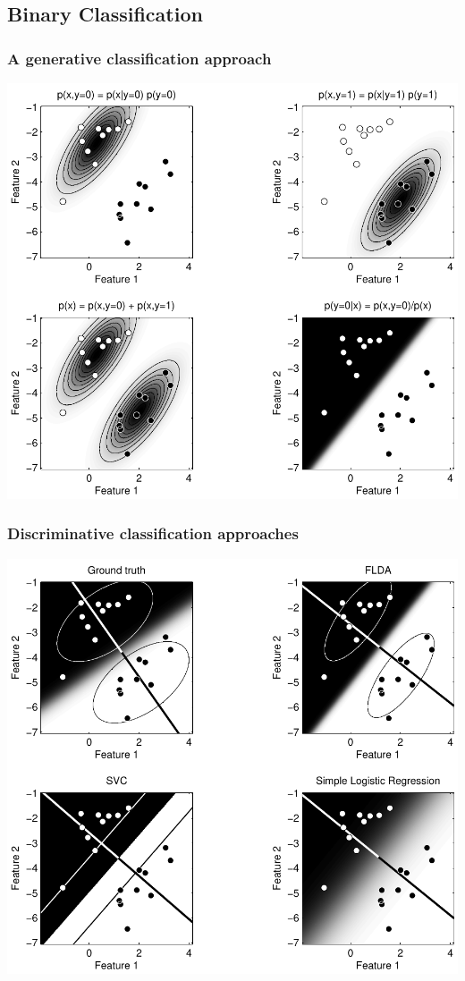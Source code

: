 \documentclass{beamer}
\begin{document}
\subsection{Binary Classification}
\begin{frame}
\frametitle{A generative classification approach}
\begin{center}
\includegraphics[height=.8\textheight]{fld}
\end{center}
\end{frame}

\begin{frame}
\frametitle{Discriminative classification approaches}
\begin{center}
\includegraphics[height=.8\textheight]{linear_discrimination}
\end{center}
\end{frame}
\end{document}

